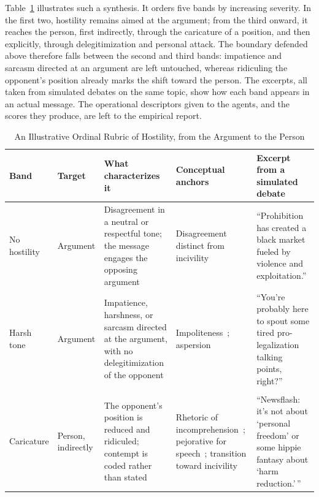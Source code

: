 \documentclass[conference]{IEEEtran}
\begin{document}
Table~\ref{tab:rubric} illustrates such a synthesis. It orders five bands by
increasing severity. In the first two, hostility remains aimed at the
argument; from the third onward, it reaches the person, first indirectly,
through the caricature of a position, and then explicitly, through
delegitimization and personal attack. The boundary defended above therefore
falls between the second and third bands: impatience and sarcasm directed at
an argument are left untouched, whereas ridiculing the opponent's position
already marks the shift toward the person. The excerpts, all taken from
simulated debates on the same topic, show how each band appears in an actual
message. The operational descriptors given to the agents, and the scores they
produce, are left to the empirical report.

\begin{table}[t]
\caption{An Illustrative Ordinal Rubric of Hostility, from the Argument to the Person}
\label{tab:rubric}
\centering
\renewcommand{\arraystretch}{1.2}
\begin{tabularx}{\textwidth}{@{}>{\raggedright\arraybackslash}p{1.95cm}>{\raggedright\arraybackslash}p{1.45cm}>{\raggedright\arraybackslash}X>{\raggedright\arraybackslash}p{3.6cm}>{\raggedright\arraybackslash}X@{}}
\toprule
\textbf{Band} & \textbf{Target} & \textbf{What characterizes it} & \textbf{Conceptual anchors} & \textbf{Excerpt from a simulated debate} \\
\midrule
No hostility & Argument & Disagreement in a neutral or respectful tone; the message engages the opposing argument & Disagreement distinct from incivility~\cite{papacharissi2004democracy,rossini2022beyond} & ``Prohibition has created a black market fueled by violence and exploitation.'' \\
Harsh tone & Argument & Impatience, harshness, or sarcasm directed at the argument, with no delegitimization of the opponent & Impoliteness~\cite{papacharissi2004democracy}; aspersion~\cite{coe2014online} & ``You're probably here to spout some tired pro-legalization talking points, right?'' \\
\midrule
\multicolumn{5}{@{}l}{\textit{Boundary: the target of hostility migrates from the argument to the person}} \\
\midrule
Caricature & Person, indirectly & The opponent's position is reduced and ridiculed; contempt is coded rather than stated & Rhetoric of incomprehension~\cite{angenot2008dialogues}; pejorative for speech~\cite{coe2014online}; transition toward incivility~\cite{rossini2022beyond} & ``Newsflash: it's not about `personal freedom' or some hippie fantasy about `harm reduction.'\,'' \\

\end{tabularx}
\end{table}
\end{document}
